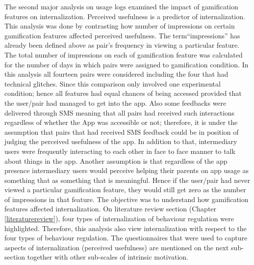 The second major analysis on usage logs examined the impact of gamification features on internalization. Perceived usefulness is a predictor of internalization. This analysis was done by contrasting how number of impressions on certain gamification features affected perceived usefulness. The term``impressions'' has already been defined above as pair's frequency in viewing a particular feature. The total number of impressions on each of gamification feature was calculated for the number of days in which pairs were assigned to gamification condition. In this analysis all fourteen pairs were considered including the four that had technical glitches. Since this comparison only involved one experimental condition; hence all features had equal chances of being accessed provided that the user/pair had managed to get into the app. Also some feedbacks were delivered through SMS meaning that all pairs had received such interactions regardless of whether the App was accessible or not; therefore, it is under the assumption that pairs that had received SMS feedback could be in position of judging the perceived usefulness of the app. In addition to that, intermediary users were frequently interacting to each other in face to face manner to talk about things in the app. Another assumption is that regardless of the app presence intermediary users would perceive helping their parents on app usage as something that as something that is meaningful. Hence if the user/pair had never viewed a particular gamification feature, they would still get zero as the number of impressions in that feature. The objective was to understand how gamification features affected internalization. On literature review section (Chapter \ref{literaturereview}), four types of internalization of behaviour regulation were highlighted. Therefore, this analysis also view internalization with respect to the four types of behaviour regulation. The questionnaires that were used to capture aspects of internalization (perceived usefulness) are mentioned on the next sub-section together with other sub-scales of intrinsic motivation.

